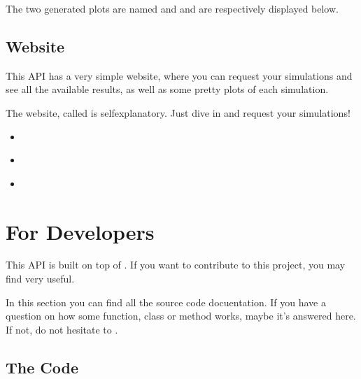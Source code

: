\documentclass[a4paper,landscape,10pt,english]{sphinxmanual}
\begin{document}
The two generated plots are named  and 
and  are respectively displayed below.

\noindent{}

\noindent{}


\section{Website}
\label{\detokenize{start/frontend:website}}\label{\detokenize{start/frontend:start-frontend}}\label{\detokenize{start/frontend::doc}}
This API has a very simple website, where you can request your simulations and
see all the available results, as well as some pretty plots of each simulation.

The website, called  is self\sphinxhyphen{}explanatory. Just dive in and request
your simulations!
\begin{itemize}
\item {} 
{\hyperref[\detokenize{start/overview:start-overview}]{}}

\item {} 
{\hyperref[\detokenize{start/examples:start-examples}]{}}

\item {} 
{\hyperref[\detokenize{start/frontend:start-frontend}]{}}

\end{itemize}


\chapter{For Developers}
\label{\detokenize{index:for-developers}}
This API is built on top of . If you want to contribute to this
project, you may find  very useful.

In this section you can find all the source code docuentation. If you have a
question on how some function, class or method works, maybe it’s answered here.
If not, do not hesitate to .


\section{The Code}
\label{\detokenize{index:the-code}}
\end{document}
